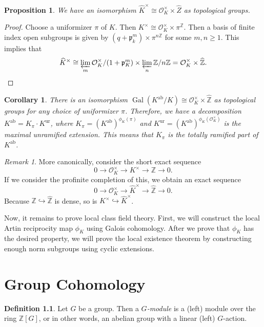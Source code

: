 \documentclass[leqno, openany]{memoir}
\newtheorem{cor}[thm]{Corollary}
\newtheorem{prop}[thm]{Proposition}
\theoremstyle{definition}
\newtheorem{defn}[thm]{Definition}
\theoremstyle{remark}
\newtheorem{rmk}[thm]{Remark}
\theoremstyle{plain}
\theoremstyle{definition}
\theoremstyle{remark}
\newcommand{\Z}{\mathbb{Z}}
\newcommand{\mc}[1]{\mathcal{#1}}
\newcommand{\mf}[1]{\mathfrak{#1}}
\newcommand{\mr}[1]{\mathrm{#1}}
\newcommand{\wh}[1]{\widehat{#1}}
\DeclareMathOperator{\Gal}{Gal}
\begin{document}
\begin{prop} We have an isomorphism $\wh{K}^{\times} \cong \mc{O}_K^{\times}
\times \wh{Z}$ as topological groups.  \end{prop}

\begin{proof} Choose a uniformizer $\pi$ of $K$. Then $K^{\times} \cong
    \mc{O}_K^{\times} \times \pi^{\Z}$. Then a basis of finite index open
    subgroups is given by $(q+\mf{p}_k^m) \times \pi^{n\Z}$ for some $m,n \geq
    1$. This implies that \[ \wh{K}^{\times} \cong \varprojlim_m
    \mc{O}_K^{\times} / (1+\mf{p}_K^m) \times \varprojlim_n \Z/n\Z =
\mc{O}_K^{\times} \times \wh{\Z}. \qedhere \] \end{proof}

\begin{cor} There is an isomorphism $\Gal(K^{\mr{ab}}/K) \cong
    \mc{O}_K^{\times} \times \wh{\Z}$ as topological groups for any choice of
    uniformizer $\pi$. Therefore, we have a decomposition $K^{\mr{ab}} =
    K_{\pi} \cdot K^{\mr{ur}}$, where $K_{\pi} = {(K^{\mr{ab}})}^{\phi_K(\pi)}$
    and $K^{\mr{ur}} = {(K^{\mr{ab}})}^{\phi_K(\mc{O}_K^{\times})}$ is the
    maximal unramified extension. This means that $K_{\pi}$ is the totally
    ramified part of $K^{\mr{ab}}$.  \end{cor}

\begin{rmk} More canonically, consider the short exact sequence \[ 0 \to
    \mc{O}_K^{\times} \to K^{\times} \to \Z \to 0. \] If we consider the
    profinite completion of this, we obtain an exact sequence \[ 0 \to
    \mc{O}_K^{\times} \to \wh{K}^{\times} \to \wh{\Z} \to 0. \] Because $\Z
\hookrightarrow \wh{\Z}$ is dense, so is $K^{\times} \hookrightarrow
\wh{K}^{\times}$.  \end{rmk}


Now, it remains to prove local class field theory. First, we will construct the
local Artin reciprocity map $\phi_K$ using Galois cohomology. After we prove
that $\phi_K$ has the desired property, we will prove the local existence
theorem by constructing enough norm subgroups using cyclic extensions.

\chapter{Group Cohomology}%

\begin{defn} Let $G$ be a group. Then a \textit{$G$-module} is a (left) module
over the ring $\Z[G]$, or in other words, an abelian group with a linear (left)
$G$-action.  \end{defn}
\end{document}
